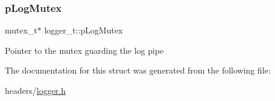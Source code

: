 \subsubsection{\texorpdfstring{p\+Log\+Mutex}{pLogMutex}}
{\footnotesize\ttfamily mutex\+\_\+t$\ast$ logger\+\_\+t\+::p\+Log\+Mutex}

Pointer to the mutex guarding the log pipe 

The documentation for this struct was generated from the following file\+:\begin{DoxyCompactItemize}
\item 
headers/\hyperlink{logger_8h}{logger.\+h}\end{DoxyCompactItemize}
